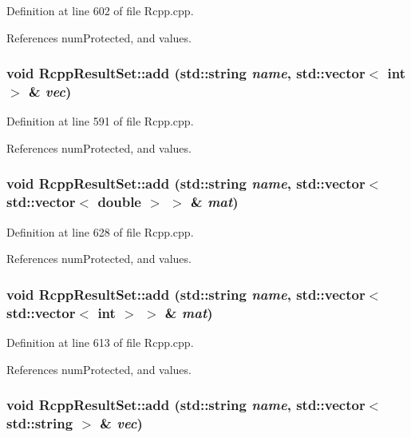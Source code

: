 Definition at line 602 of file Rcpp.cpp.

References numProtected, and values.\hypertarget{classRcppResultSet_23fa5be81281adcf3014749094816522}{
\subsubsection[add]{\setlength{\rightskip}{0pt plus 5cm}void RcppResultSet::add (std::string {\em name}, \/  std::vector$<$ int $>$ \& {\em vec})}}
\label{classRcppResultSet_23fa5be81281adcf3014749094816522}




Definition at line 591 of file Rcpp.cpp.

References numProtected, and values.\hypertarget{classRcppResultSet_b10cd8503c12708e27068b92a83e4047}{
\subsubsection[add]{\setlength{\rightskip}{0pt plus 5cm}void RcppResultSet::add (std::string {\em name}, \/  std::vector$<$ std::vector$<$ double $>$ $>$ \& {\em mat})}}
\label{classRcppResultSet_b10cd8503c12708e27068b92a83e4047}




Definition at line 628 of file Rcpp.cpp.

References numProtected, and values.\hypertarget{classRcppResultSet_b51f30f4bd5f3c6153221a3bd7bb7e24}{
\subsubsection[add]{\setlength{\rightskip}{0pt plus 5cm}void RcppResultSet::add (std::string {\em name}, \/  std::vector$<$ std::vector$<$ int $>$ $>$ \& {\em mat})}}
\label{classRcppResultSet_b51f30f4bd5f3c6153221a3bd7bb7e24}




Definition at line 613 of file Rcpp.cpp.

References numProtected, and values.\hypertarget{classRcppResultSet_db4236a049c8dceb7112229f5e68a295}{
\subsubsection[add]{\setlength{\rightskip}{0pt plus 5cm}void RcppResultSet::add (std::string {\em name}, \/  std::vector$<$ std::string $>$ \& {\em vec})}}
\label{classRcppResultSet_db4236a049c8dceb7112229f5e68a295}




